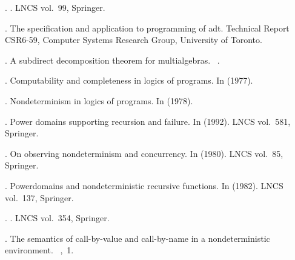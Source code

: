 {\begin{thebibliography}{}
 .
\newblock {}.
\newblock LNCS vol.~99, Springer.

 .
\newblock The specification and application to programming of adt.
\newblock Technical Report CSR6-59, Computer Systems Research Group, University
  of Toronto.

 .
\newblock A subdirect decomposition theorem for multialgebras.
\newblock {}~.

 .
\newblock Computability and completeness in logics of programs.
\newblock In 
  (1977).

 .
\newblock Nondeterminism in logics of programs.
\newblock In  (1978).

 .
\newblock Power domains supporting recursion and failure.
\newblock In  (1992). LNCS vol.~581, Springer.

 .
\newblock On observing nondeterminism and concurrency.
\newblock In  (1980). LNCS
  vol.~85, Springer.

 .
\newblock Powerdomains and nondeterministic recursive functions.
\newblock In  (1982).
  LNCS vol.~137, Springer.

 .
\newblock {}.
\newblock LNCS vol.~354, Springer.

 .
\newblock The semantics of call-by-value and call-by-name in a nondeterministic
  environment.
\newblock {}~,~1.


\end{thebibliography}}
